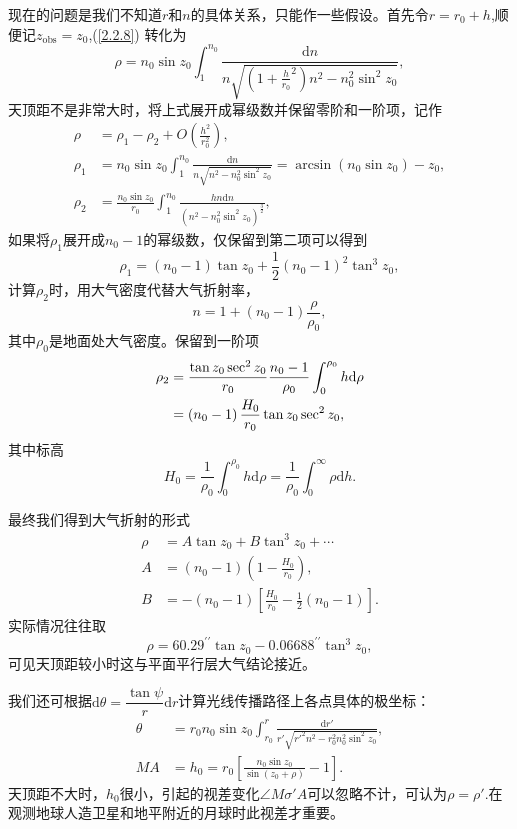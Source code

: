 \documentclass[11pt, a4paper, oneside]{ctexart}
\numberwithin{equation}{subsection}
\begin{document}
现在的问题是我们不知道$r$和$n$的具体关系，只能作一些假设。首先令$r=r_0+h$,顺便记$z_{\text{obs}}=z_{0}$,(\ref{2.2.8}) 转化为
\begin{equation}
\rho=n_0\sin z_0\int_1^{n_0}\frac{\mathrm{d}n}{n\sqrt{\left(1+\frac{h}{r_0}^2\right)n^2-n_0^2\sin^{2}z_0}},
\end{equation}
天顶距不是非常大时，将上式展开成幂级数并保留零阶和一阶项，记作
\begin{align}
\rho&=\rho_1-\rho_2+O\left(\frac{h^2}{r_0^2}\right),\\
\rho_1&=n_0\sin z_0\int_1^{n_0}\frac{\mathrm{d}n}{n\sqrt{n^2-n_0^2\sin^2z_0}}=\arcsin\left(n_0\sin z_0\right)-z_0,\\
\rho_2&=\frac{n_0\sin z_0}{r_0}\int_1^{n_0}\frac{hn\mathrm{d}n}{\left(n^2-n_0^2\sin^2z_0\right)^\frac32},
\end{align}
如果将$\rho_1$展开成$n_0-1$的幂级数，仅保留到第二项可以得到
\begin{equation}
\rho_1=\left(n_0-1\right)\tan z_0+\frac{1}{2}\left(n_0-1\right)^2\tan^3z_0,
\end{equation}
计算$\rho_2$时，用大气密度代替大气折射率，
\begin{equation}
n=1+\left(n_0-1\right)\frac{\rho}{\rho_0},
\end{equation}
其中$\rho_0$是地面处大气密度。保留到一阶项
\begin{align}
\rho_2&=\frac{\tan z_0\sec^2 z_0}{r_0}\frac{n_0-1}{\rho_0}\int_0^{\rho_0}h\mathrm{d}\rho\notag\\
&=\left(n_0-1\right)\frac{H_0}{r_0}\tan z_0\sec^2z_0,
\end{align}
其中标高
\begin{equation}
H_0=\frac{1}{\rho_0}\int_0^{\rho_0}h\mathrm{d}\rho=\frac{1}{\rho_0}\int_0^\infty\rho\mathrm{d}h.
\end{equation}

最终我们得到大气折射的形式
\begin{align}
\rho&=A\tan z_0+B\tan^3z_0+\cdots\\
A&=\left(n_0-1\right)\left(1-\frac{H_0}{r_0}\right),\\
B&=-\left(n_0-1\right)\left[\frac{H_0}{r_0}-\frac{1}{2}\left(n_0-1\right)\right].
\end{align}
实际情况往往取
\begin{equation}
\rho=60.29^{\prime\prime}\tan z_0-0.06688^{\prime\prime}\tan^3z_0,
\end{equation}
可见天顶距较小时这与平面平行层大气结论接近。

我们还可根据$\mathrm{d}\theta=\dfrac{\tan\psi}{r}\mathrm{d}r$计算光线传播路径上各点具体的极坐标：
\begin{align}
\theta&=r_0n_0\sin z_0\int_{r_0}^r\frac{\mathrm{d}r'}{r'\sqrt{r'^{2}n^2-r^2_0n_0^2\sin^2z_0}},\\
MA&=h_0=r_0\left[\frac{n_0\sin z_0}{\sin\left(z_0+\rho\right)}-1\right].
\end{align}
天顶距不大时，$h_{0}$很小，引起的视差变化$\angle{M\sigma'A}$可以忽略不计，可认为$\rho=\rho'$.在观测地球人造卫星和地平附近的月球时此视差才重要。
\end{document}
